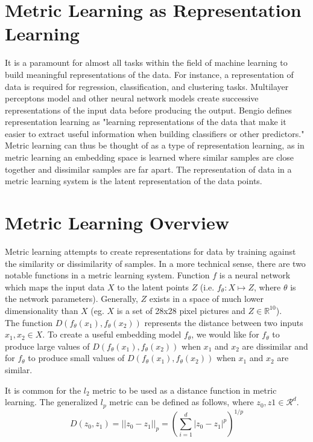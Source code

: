 \documentclass[./dissertation.tex]{subfiles}
\begin{document}
    
    \section{Metric Learning as Representation Learning}
    It is a paramount for almost all tasks within the field of machine learning to build meaningful representations of the data. For instance, a representation of data is required for regression, classification, and clustering tasks. Multilayer perceptons model and other neural network models create successive representations of the input data before producing the output. Bengio defines representation learning as "learning representations of the data that make it easier to extract useful information when building classifiers or other predictors." \cite{bengio2013representation}\\
    
    Metric learning can thus be thought of as a type of representation learning, as in metric learning an embedding space is learned where similar samples are close together and dissimilar samples are far apart. The representation of data in a metric learning system is the latent representation of the data points. 
    \section{Metric Learning Overview}
    Metric learning attempts to create representations for data by training against the similarity or dissimilarity of samples. In a more technical sense, there are two notable functions in a metric learning system. Function $f$ is a neural network which maps the input data $X$ to the latent points $Z$ (i.e. $f_{\theta}: X \mapsto Z$, where $\theta$ is the network parameters). Generally, $Z$ exists in a space of much lower dimensionality than $X$ (eg. $X$ is a set of 28x28 pixel pictures and $Z \in \mathbb{R}^{10}$).\\
    
    The function $D(f_{\theta}(x_{1}), f_{\theta}(x_{2}))$ represents the distance between two inputs $x_{1}, x_{2} \in X$. To create a useful embedding model $f_{\theta}$, we would like for $f_{\theta}$ to produce large values of $D(f_{\theta}(x_{1}), f_{\theta}(x_{2}))$ when $x_{1}$ and $x_{2}$ are dissimilar and for $f_{\theta}$ to produce small values of $D(f_{\theta}(x_{1}), f_{\theta}(x_{2}))$ when $x_{1}$ and $x_{2}$ are similar.\
    
    It is common for the $l_{2}$ metric to be used as a distance function in metric learning. The generalized $l_p$ metric can be defined as follows, where $z_{0}, z{1} \in \mathcal{R}^{d}$.
          \begin{equation*}
            D(z_{0}, z_{1})= || z_{0} - z_{1} ||_{p} =
            (\sum_{i=1}^d | z_{0} - z_{1} |^{p})^{1/p} 
          \end{equation*}
    
\end{document}
